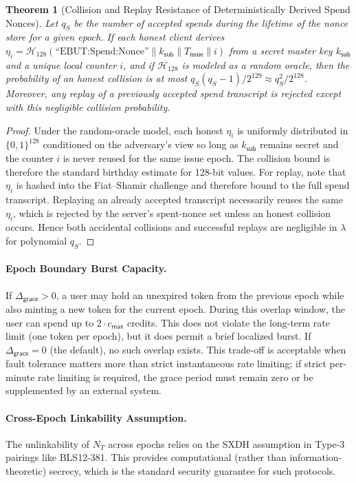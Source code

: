 \documentclass[11pt]{article}
\theoremstyle{definitionstyle}
\newtheorem{theorem}{Theorem}[section]
\theoremstyle{plain}
\begin{document}
\begin{theorem}[Collision and Replay Resistance of Deterministically Derived Spend Nonces]
Let $q_S$ be the number of accepted spends during the lifetime of the nonce store for a given epoch. If each honest client derives $\eta_i = \mathcal{H}_{128}(\text{``EBUT:Spend:Nonce''} \parallel k_{\mathsf{sub}} \parallel T_{\mathsf{issue}} \parallel i)$ from a secret master key $k_{\mathsf{sub}}$ and a unique local counter $i$, and if $\mathcal{H}_{128}$ is modeled as a random oracle, then the probability of an honest collision is at most $q_S(q_S-1)/2^{129} \approx q_S^2/2^{128}$. Moreover, any replay of a previously accepted spend transcript is rejected except with this negligible collision probability.
\end{theorem}
\begin{proof}
Under the random-oracle model, each honest $\eta_i$ is uniformly distributed in $\{0,1\}^{128}$ conditioned on the adversary's view so long as $k_{\mathsf{sub}}$ remains secret and the counter $i$ is never reused for the same issue epoch. The collision bound is therefore the standard birthday estimate for 128-bit values. For replay, note that $\eta_i$ is hashed into the Fiat--Shamir challenge and therefore bound to the full spend transcript. Replaying an already accepted transcript necessarily reuses the same $\eta_i$, which is rejected by the server's spent-nonce set unless an honest collision occurs. Hence both accidental collisions and successful replays are negligible in $\lambda$ for polynomial $q_S$.
\end{proof}

\paragraph{Epoch Boundary Burst Capacity.}
If $\Delta_{\mathsf{grace}} > 0$, a user may hold an unexpired token from the previous epoch while also minting a new token for the current epoch. During this overlap window, the user can spend up to $2 \cdot c_{\mathsf{max}}$ credits. This does not violate the long-term rate limit (one token per epoch), but it does permit a brief localized burst. If $\Delta_{\mathsf{grace}} = 0$ (the default), no such overlap exists. This trade-off is acceptable when fault tolerance matters more than strict instantaneous rate limiting; if strict per-minute rate limiting is required, the grace period must remain zero or be supplemented by an external system.

\paragraph{Cross-Epoch Linkability Assumption.}
The unlinkability of $N_T$ across epochs relies on the SXDH assumption in Type-3 pairings like BLS12-381. This provides computational (rather than information-theoretic) secrecy, which is the standard security guarantee for such protocols.
\end{document}
